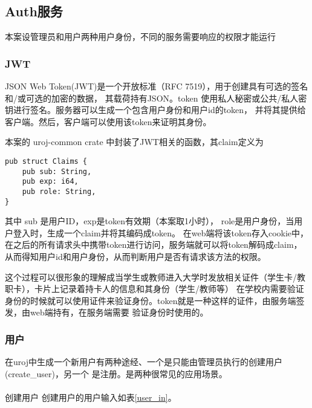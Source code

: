 \subsection{Auth服务}
本案设管理员和用户两种用户身份，不同的服务需要响应的权限才能运行
\subsubsection{JWT}
JSON Web Token(JWT)是一个开放标准（RFC 7519），用于创建具有可选的签名和/或可选的加密的数据，
其载荷持有JSON。token 使用私人秘密或公共/私人密钥进行签名。服务器可以生成一个包含用户身份和用户id的token，
并将其提供给客户端。然后，客户端可以使用该token来证明其身份。

本案的 uroj-common crate 中封装了JWT相关的函数，其claim定义为
\begin{lstlisting}
pub struct Claims {
    pub sub: String,
    pub exp: i64,
    pub role: String,
}
\end{lstlisting}

其中 sub 是用户ID，exp是token有效期（本案取1小时），
role是用户身份，当用户登入时，生成一个claim并将其编码成token。
在web端将该token存入cookie中，在之后的所有请求头中携带token进行访问，服务端就可以将token解码成claim，
从而得知用户id和用户身份，从而判断用户是否有请求该方法的权限。

这个过程可以很形象的理解成当学生或教师进入大学时发放相关证件（学生卡/教职卡），卡片上记录着持卡人的信息和其身份（学生/教师等）
在学校内需要验证身份的时候就可以使用证件来验证身份。token就是一种这样的证件，由服务端签发，由web端持有，在服务端需要
验证身份时使用的。

\subsubsection{用户}
在uroj中生成一个新用户有两种途经、一个是只能由管理员执行的创建用户(create\_user)，另一个
是注册。是两种很常见的应用场景。

\paragraph{}创建用户
创建用户的用户输入如表\ref{user_in}。

